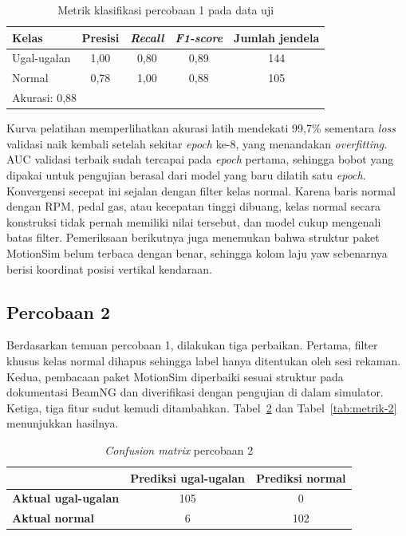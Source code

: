 \begin{table}[H]
  \centering
  \caption{Metrik klasifikasi percobaan 1 pada data uji}
  \label{tab:metrik-1}
  \begin{tabular}{|l|c|c|c|c|}
    \hline
    \textbf{Kelas} & \textbf{Presisi} & \textbf{\textit{Recall}} & \textbf{\textit{F1-score}} & \textbf{Jumlah jendela} \\
    \hline
    Ugal-ugalan & 1,00 & 0,80 & 0,89 & 144 \\
    \hline
    Normal & 0,78 & 1,00 & 0,88 & 105 \\
    \hline
    \multicolumn{5}{|l|}{Akurasi: 0,88} \\
    \hline
  \end{tabular}
\end{table}

Kurva pelatihan memperlihatkan akurasi latih mendekati 99,7\% sementara \textit{loss} validasi naik kembali setelah sekitar \textit{epoch} ke-8, yang menandakan \textit{overfitting}. AUC validasi terbaik sudah tercapai pada \textit{epoch} pertama, sehingga bobot yang dipakai untuk pengujian berasal dari model yang baru dilatih satu \textit{epoch}. Konvergensi secepat ini sejalan dengan filter kelas normal. Karena baris normal dengan RPM, pedal gas, atau kecepatan tinggi dibuang, kelas normal secara konstruksi tidak pernah memiliki nilai tersebut, dan model cukup mengenali batas filter. Pemeriksaan berikutnya juga menemukan bahwa struktur paket MotionSim belum terbaca dengan benar, sehingga kolom laju yaw sebenarnya berisi koordinat posisi vertikal kendaraan.

\subsection{Percobaan 2}
Berdasarkan temuan percobaan 1, dilakukan tiga perbaikan. Pertama, filter khusus kelas normal dihapus sehingga label hanya ditentukan oleh sesi rekaman. Kedua, pembacaan paket MotionSim diperbaiki sesuai struktur pada dokumentasi BeamNG dan diverifikasi dengan pengujian di dalam simulator. Ketiga, tiga fitur sudut kemudi ditambahkan. Tabel~\ref{tab:cm-2} dan Tabel~\ref{tab:metrik-2} menunjukkan hasilnya.

\begin{table}[H]
  \centering
  \caption{\textit{Confusion matrix} percobaan 2}
  \label{tab:cm-2}
  \begin{tabular}{|l|c|c|}
    \hline
     & \textbf{Prediksi ugal-ugalan} & \textbf{Prediksi normal} \\
    \hline
    \textbf{Aktual ugal-ugalan} & 105 & 0 \\
    \hline
    \textbf{Aktual normal} & 6 & 102 \\
    \hline
  \end{tabular}
\end{table}

